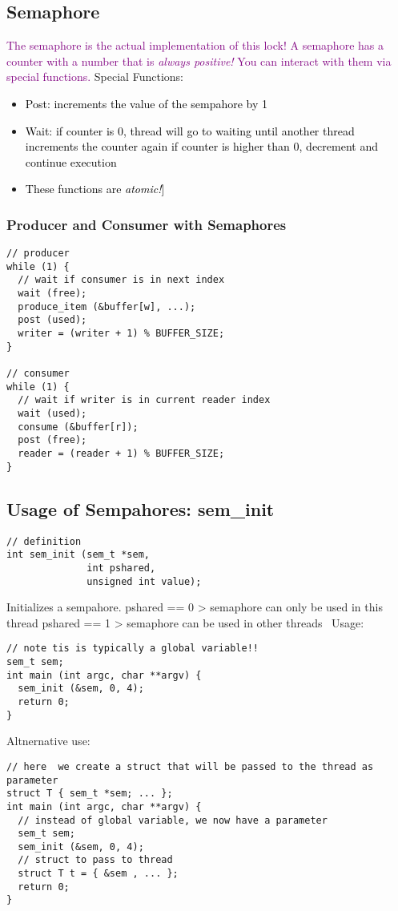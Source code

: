 \documentclass[main.tex,fontsize=8pt,paper=a4,paper=portrait,DIV=calc,]{scrartcl}
\begin{document}
\subsection{Semaphore}
\textcolor{purple}{The semaphore is the actual implementation of this lock!\newline
  A semaphore has a counter with a number that is \emph{always positive!}\newline
You can interact with them via special functions.}\newline
Special Functions:
\begin{itemize}
\item \textcolor{black}{Post: increments the value of the sempahore by 1}
\item \textcolor{black}{Wait: if counter is 0, thread will go to waiting until another thread increments the counter again\newline
  if counter is higher than 0, decrement and continue execution}
\item \textcolor{black}{These functions are \emph{atomic!}]}
\end{itemize} 

\subsubsection{Producer and Consumer with Semaphores}
\begin{lstlisting}
// producer
while (1) {
  // wait if consumer is in next index
  wait (free);
  produce_item (&buffer[w], ...);
  post (used);
  writer = (writer + 1) % BUFFER_SIZE;
}

// consumer
while (1) {
  // wait if writer is in current reader index
  wait (used);
  consume (&buffer[r]);
  post (free);
  reader = (reader + 1) % BUFFER_SIZE;
}
\end{lstlisting}

\subsection{Usage of Sempahores: sem\_init}
\begin{lstlisting}
// definition
int sem_init (sem_t *sem,
              int pshared,
              unsigned int value);
\end{lstlisting}
Initializes a sempahore. \newline
pshared == 0 > semaphore can only be used in this thread\newline
pshared == 1 > semaphore can be used in other threads
\, \newline
Usage:
\begin{lstlisting}
// note tis is typically a global variable!!
sem_t sem;
int main (int argc, char **argv) {
  sem_init (&sem, 0, 4);
  return 0;
}
\end{lstlisting}
Altnernative use: 
\begin{lstlisting}
// here  we create a struct that will be passed to the thread as parameter
struct T { sem_t *sem; ... };
int main (int argc, char **argv) {
  // instead of global variable, we now have a parameter
  sem_t sem;
  sem_init (&sem, 0, 4);
  // struct to pass to thread
  struct T t = { &sem , ... };
  return 0;
}
\end{lstlisting}
\end{document}
